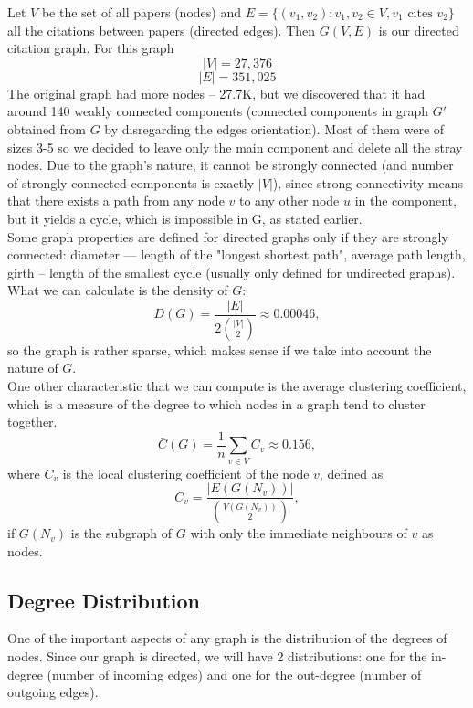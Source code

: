 \documentclass{article}
\newcommand\tab[1][1cm]{\hspace*{#1}}
\begin{document}
\tab Let $V$ be the set of all papers (nodes) and $E = \{(v_1, v_2): v_1, v_2 \in V, v_1 \text{ cites } v_2 \}$ all the citations between papers (directed edges). Then $G(V, E)$ is our directed citation graph.
For this graph $$|V| = 27,376$$ $$|E| = 351,025$$
\tab The original graph had more nodes -- 27.7K, but we discovered that it had around 140 weakly connected components (connected components in graph $G'$ obtained from $G$ by disregarding the edges orientation). Most of them were of sizes 3-5 so we decided to leave only the main component and delete all the stray nodes. Due to the graph's nature, it cannot be strongly connected (and number of strongly connected components is exactly $|V|$), since strong connectivity means that there exists a path from any node $v$ to any other node $u$ in the component, but it yields a cycle, which is impossible in G, as stated earlier. \\
\tab Some graph properties are defined for directed graphs only if they are strongly connected: diameter --- length of the "longest shortest path", average path length, girth -- length of the smallest cycle (usually only defined for undirected graphs). What we can calculate is the density of $G$:
$$D(G) = \frac{|E|}{2\binom{|V|}{2}} \approx 0.00046,$$
so the graph is rather sparse, which makes sense if we take into account the nature of $G$.\\
\tab One other characteristic that we can compute is the average clustering coefficient, which is a measure of the degree to which nodes in a graph tend to cluster together. 
$$\bar{C}(G) = \frac{1}{n}\sum_{v \in V}C_v \approx 0.156,$$
where $C_v$ is the local clustering coefficient of the node $v$, defined as $$C_v = \frac{|E(G(N_v))|}{\binom{V(G(N_v))}{2}},$$
if $G(N_v)$ is the subgraph of $G$ with only the immediate neighbours of $v$  as nodes.

\subsection{Degree Distribution}
\tab One of the important aspects of any graph is the distribution of the degrees of nodes. Since our graph is directed, we will have 2 distributions: one for the in-degree (number of incoming edges) and one for the out-degree (number of outgoing edges).
\end{document}
